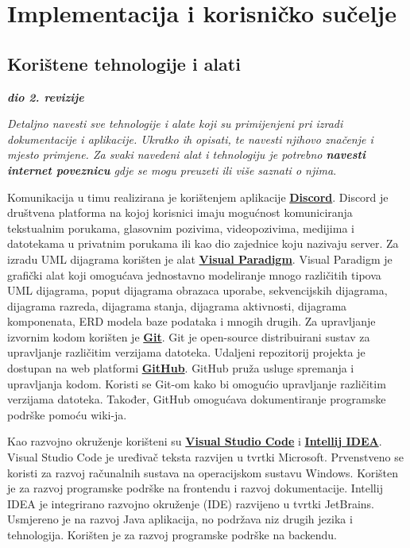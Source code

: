 \chapter{Implementacija i korisničko sučelje}
		
		
		\section{Korištene tehnologije i alati}
		
			\textbf{\textit{dio 2. revizije}}
			
			 \textit{Detaljno navesti sve tehnologije i alate koji su primijenjeni pri izradi dokumentacije i aplikacije. Ukratko ih opisati, te navesti njihovo značenje i mjesto primjene. Za svaki navedeni alat i tehnologiju je potrebno \textbf{navesti internet poveznicu} gdje se mogu preuzeti ili više saznati o njima}.
			 
			 Komunikacija u timu realizirana je korištenjem aplikacije \textbf{\href{https://discord.com/}{Discord}}. 
			 Discord je društvena platforma na kojoj korisnici imaju mogućnost komuniciranja tekstualnim porukama, glasovnim
			 pozivima, videopozivima, medijima i datotekama u privatnim porukama ili kao dio zajednice koju nazivaju server. 
			 Za izradu UML dijagrama korišten je alat \textbf{\href{https://www.visual-paradigm.com/}{Visual Paradigm}}. Visual 
			 Paradigm je grafički alat koji omogućava jednostavno modeliranje mnogo različitih tipova UML dijagrama, poput 
			 dijagrama obrazaca uporabe, sekvencijskih dijagrama, dijagrama razreda, dijagrama stanja, dijagrama aktivnosti, 
			 dijagrama komponenata, ERD modela baze podataka i mnogih drugih. Za upravljanje izvornim kodom korišten je 
			 \textbf{\href{https://git-scm.com/}{Git}}. Git je open-source distribuirani sustav za upravljanje različitim 
			 verzijama datoteka. Udaljeni repozitorij projekta je dostupan na web platformi \textbf{\href{https://github.com/}{GitHub}}.
			 GitHub pruža usluge spremanja i upravljanja kodom. Koristi se Git-om kako bi omogućio upravljanje različitim 
			 verzijama datoteka. Također, GitHub omogućava dokumentiranje programske podrške pomoću wiki-ja.

			 Kao razvojno okruženje korišteni su \textbf{\href{https://code.visualstudio.com/}{Visual Studio Code}} 
			 i \textbf{\href{https://www.jetbrains.com/idea//}{Intellij IDEA}}. Visual Studio Code je uređivač teksta
			 razvijen u tvrtki Microsoft. Prvenstveno se koristi za razvoj računalnih sustava na operacijskom sustavu Windows. 
			 Korišten je za razvoj programske podrške na frontendu i razvoj dokumentacije. Intellij IDEA je integrirano razvojno 
			 okruženje (IDE) razvijeno u tvrtki JetBrains. Usmjereno je na razvoj Java aplikacija, no podržava niz drugih jezika i 
			 tehnologija. Korišten je za razvoj programske podrške na backendu.

